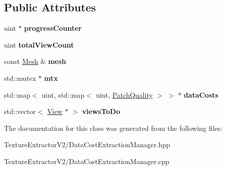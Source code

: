 \subsection*{Public Attributes}
\begin{DoxyCompactItemize}
\item 
\hypertarget{class_data_cost_extraction_manager_a97997e576d25554a8805934a81382d38}{}uint $\ast$ {\bfseries progress\+Counter}\label{class_data_cost_extraction_manager_a97997e576d25554a8805934a81382d38}

\item 
\hypertarget{class_data_cost_extraction_manager_ad2cbdefd98fdde78bf62b5602befa9e5}{}uint {\bfseries total\+View\+Count}\label{class_data_cost_extraction_manager_ad2cbdefd98fdde78bf62b5602befa9e5}

\item 
\hypertarget{class_data_cost_extraction_manager_afa915680af20f1ac535cbc3205f7c35a}{}const \hyperlink{class_mesh}{Mesh} \& {\bfseries mesh}\label{class_data_cost_extraction_manager_afa915680af20f1ac535cbc3205f7c35a}

\item 
\hypertarget{class_data_cost_extraction_manager_a701cc390cea498e7477cd2e06cf48e01}{}std\+::mutex $\ast$ {\bfseries mtx}\label{class_data_cost_extraction_manager_a701cc390cea498e7477cd2e06cf48e01}

\item 
\hypertarget{class_data_cost_extraction_manager_aab34038a5dd8e8e24a44fe102e722cca}{}std\+::map$<$ uint, std\+::map$<$ uint, \hyperlink{struct_patch_quality}{Patch\+Quality} $>$ $>$ $\ast$ {\bfseries data\+Costs}\label{class_data_cost_extraction_manager_aab34038a5dd8e8e24a44fe102e722cca}

\item 
\hypertarget{class_data_cost_extraction_manager_afec2fa6aa627fb80c2734b4c5f895afa}{}std\+::vector$<$ \hyperlink{class_view}{View} $\ast$ $>$ {\bfseries views\+To\+Do}\label{class_data_cost_extraction_manager_afec2fa6aa627fb80c2734b4c5f895afa}

\end{DoxyCompactItemize}


The documentation for this class was generated from the following files\+:\begin{DoxyCompactItemize}
\item 
Texture\+Extractor\+V2/Data\+Cost\+Extraction\+Manager.\+hpp\item 
Texture\+Extractor\+V2/Data\+Cost\+Extraction\+Manager.\+cpp\end{DoxyCompactItemize}
